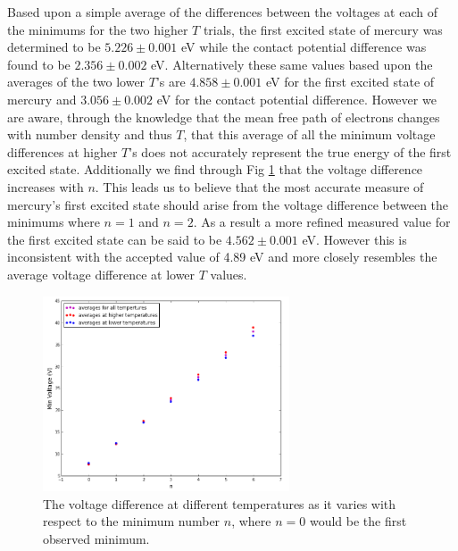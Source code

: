 \documentclass[prb,preprint]{revtex4-1}
\begin{document}
\newpage

Based upon a simple average of the differences between the voltages at each of the minimums for the two higher $T$ trials, the first excited state of mercury was determined to be $5.226\pm0.001$ eV while the contact potential difference was found to be $2.356\pm0.002$ eV. Alternatively these same values based upon the averages of the two lower $T$'s are $4.858\pm0.001$ eV for the first excited state of mercury and $3.056\pm0.002$ eV for the contact potential difference. However we are aware, through the knowledge that the mean free path of electrons changes with number density and thus $T$, that this average of all the minimum voltage differences at higher $T$'s does not accurately represent the true energy of the first excited state. Additionally we find through Fig \ref{diff} that the voltage difference increases with $n$. This leads us to believe that the most accurate measure of mercury's first excited state should arise from the voltage difference between the minimums where $n=1$ and $n=2$. As a result a more refined measured value for the first excited state can be said to be $4.562\pm0.001$ eV. However this is inconsistent with the accepted value of 4.89 eV and more closely resembles the average voltage difference at lower $T$ values.

\begin{figure}[h]
\centering
\includegraphics[width=0.65\textwidth]{diff.png}
\caption{The voltage difference at different temperatures as it varies with respect to the minimum number $n$, where $n=0$ would be the first observed minimum.}
\label{diff}
\end{figure}

\newpage
\end{document}
